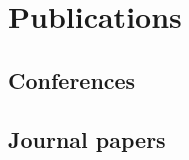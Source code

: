 \chapter{Publications}
\label{chap:publications}

\begin{refsection}
	\section*{Conferences}
		
	\section*{Journal papers}
\end{refsection}